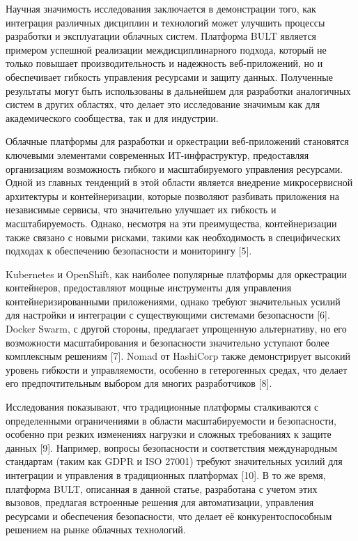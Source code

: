 \begin{multicols}{2}
Научная значимость исследования заключается в демонстрации того, как
интеграция различных дисциплин и технологий может улучшить процессы
разработки и эксплуатации облачных систем. Платформа BULT является
примером успешной реализации междисциплинарного подхода, который не
только повышает производительность и надежность веб-приложений, но и
обеспечивает гибкость управления ресурсами и защиту данных. Полученные
результаты могут быть использованы в дальнейшем для разработки
аналогичных систем в других областях, что делает это исследование
значимым как для академического сообщества, так и для индустрии.

Облачные платформы для разработки и оркестрации веб-приложений
становятся ключевыми элементами современных ИТ-инфраструктур,
предоставляя организациям возможность гибкого и масштабируемого
управления ресурсами. Одной из главных тенденций в этой области является
внедрение микросервисной архитектуры и контейнеризации, которые
позволяют разбивать приложения на независимые сервисы, что значительно
улучшает их гибкость и масштабируемость. Однако, несмотря на эти
преимущества, контейнеризации также связано с новыми рисками, такими как
необходимость в специфических подходах к обеспечению безопасности и
мониторингу {[}5{]}.

Kubernetes и OpenShift, как наиболее популярные платформы для
оркестрации контейнеров, предоставляют мощные инструменты для управления
контейнеризированными приложениями, однако требуют значительных усилий
для настройки и интеграции с существующими системами безопасности
{[}6{]}. Docker Swarm, с другой стороны, предлагает упрощенную
альтернативу, но его возможности масштабирования и безопасности
значительно уступают более комплексным решениям {[}7{]}. Nomad от
HashiCorp также демонстрирует высокий уровень гибкости и управляемости,
особенно в гетерогенных средах, что делает его предпочтительным выбором
для многих разработчиков {[}8{]}.

Исследования показывают, что традиционные платформы сталкиваются с
определенными ограничениями в области масштабируемости и безопасности,
особенно при резких изменениях нагрузки и сложных требованиях к защите
данных {[}9{]}. Например, вопросы безопасности и соответствия
международным стандартам (таким как GDPR и ISO 27001) требуют
значительных усилий для интеграции и управления в традиционных
платформах {[}10{]}. В то же время, платформа BULT, описанная в данной
статье, разработана с учетом этих вызовов, предлагая встроенные решения
для автоматизации, управления ресурсами и обеспечения безопасности, что
делает её конкурентоспособным решением на рынке облачных технологий.


\end{multicols}
